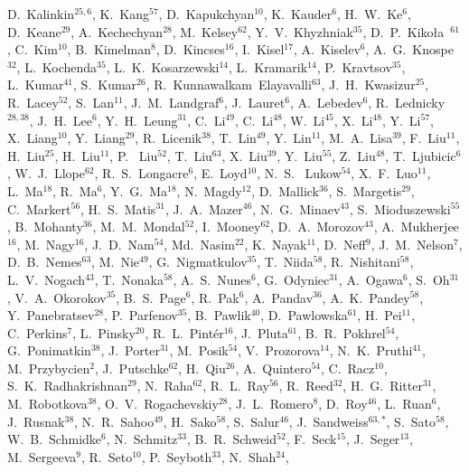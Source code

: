 {D.~Kalinkin$^{25,6}$,
K.~Kang$^{57}$,
D.~Kapukchyan$^{10}$,
K.~Kauder$^{6}$,
H.~W.~Ke$^{6}$,
D.~Keane$^{29}$,
A.~Kechechyan$^{28}$,
M.~Kelsey$^{62}$,
Y.~V.~Khyzhniak$^{35}$,
D.~P.~Kiko\l{}a~$^{61}$,
C.~Kim$^{10}$,
B.~Kimelman$^{8}$,
D.~Kincses$^{16}$,
I.~Kisel$^{17}$,
A.~Kiselev$^{6}$,
A.~G.~Knospe$^{32}$,
L.~Kochenda$^{35}$,
L.~K.~Kosarzewski$^{14}$,
L.~Kramarik$^{14}$,
P.~Kravtsov$^{35}$,
L.~Kumar$^{41}$,
S.~Kumar$^{26}$,
R.~Kunnawalkam~Elayavalli$^{63}$,
J.~H.~Kwasizur$^{25}$,
R.~Lacey$^{52}$,
S.~Lan$^{11}$,
J.~M.~Landgraf$^{6}$,
J.~Lauret$^{6}$,
A.~Lebedev$^{6}$,
R.~Lednicky$^{28,38}$,
J.~H.~Lee$^{6}$,
Y.~H.~Leung$^{31}$,
C.~Li$^{49}$,
C.~Li$^{48}$,
W.~Li$^{45}$,
X.~Li$^{48}$,
Y.~Li$^{57}$,
X.~Liang$^{10}$,
Y.~Liang$^{29}$,
R.~Licenik$^{38}$,
T.~Lin$^{49}$,
Y.~Lin$^{11}$,
M.~A.~Lisa$^{39}$,
F.~Liu$^{11}$,
H.~Liu$^{25}$,
H.~Liu$^{11}$,
P.~ Liu$^{52}$,
T.~Liu$^{63}$,
X.~Liu$^{39}$,
Y.~Liu$^{55}$,
Z.~Liu$^{48}$,
T.~Ljubicic$^{6}$,
W.~J.~Llope$^{62}$,
R.~S.~Longacre$^{6}$,
E.~Loyd$^{10}$,
N.~S.~ Lukow$^{54}$,
X.~F.~Luo$^{11}$,
L.~Ma$^{18}$,
R.~Ma$^{6}$,
Y.~G.~Ma$^{18}$,
N.~Magdy$^{12}$,
D.~Mallick$^{36}$,
S.~Margetis$^{29}$,
C.~Markert$^{56}$,
H.~S.~Matis$^{31}$,
J.~A.~Mazer$^{46}$,
N.~G.~Minaev$^{43}$,
S.~Mioduszewski$^{55}$,
B.~Mohanty$^{36}$,
M.~M.~Mondal$^{52}$,
I.~Mooney$^{62}$,
D.~A.~Morozov$^{43}$,
A.~Mukherjee$^{16}$,
M.~Nagy$^{16}$,
J.~D.~Nam$^{54}$,
Md.~Nasim$^{22}$,
K.~Nayak$^{11}$,
D.~Neff$^{9}$,
J.~M.~Nelson$^{7}$,
D.~B.~Nemes$^{63}$,
M.~Nie$^{49}$,
G.~Nigmatkulov$^{35}$,
T.~Niida$^{58}$,
R.~Nishitani$^{58}$,
L.~V.~Nogach$^{43}$,
T.~Nonaka$^{58}$,
A.~S.~Nunes$^{6}$,
G.~Odyniec$^{31}$,
A.~Ogawa$^{6}$,
S.~Oh$^{31}$,
V.~A.~Okorokov$^{35}$,
B.~S.~Page$^{6}$,
R.~Pak$^{6}$,
A.~Pandav$^{36}$,
A.~K.~Pandey$^{58}$,
Y.~Panebratsev$^{28}$,
P.~Parfenov$^{35}$,
B.~Pawlik$^{40}$,
D.~Pawlowska$^{61}$,
H.~Pei$^{11}$,
C.~Perkins$^{7}$,
L.~Pinsky$^{20}$,
R.~L.~Pint\'{e}r$^{16}$,
J.~Pluta$^{61}$,
B.~R.~Pokhrel$^{54}$,
G.~Ponimatkin$^{38}$,
J.~Porter$^{31}$,
M.~Posik$^{54}$,
V.~Prozorova$^{14}$,
N.~K.~Pruthi$^{41}$,
M.~Przybycien$^{2}$,
J.~Putschke$^{62}$,
H.~Qiu$^{26}$,
A.~Quintero$^{54}$,
C.~Racz$^{10}$,
S.~K.~Radhakrishnan$^{29}$,
N.~Raha$^{62}$,
R.~L.~Ray$^{56}$,
R.~Reed$^{32}$,
H.~G.~Ritter$^{31}$,
M.~Robotkova$^{38}$,
O.~V.~Rogachevskiy$^{28}$,
J.~L.~Romero$^{8}$,
D.~Roy$^{46}$,
L.~Ruan$^{6}$,
J.~Rusnak$^{38}$,
N.~R.~Sahoo$^{49}$,
H.~Sako$^{58}$,
S.~Salur$^{46}$,
J.~Sandweiss$^{63,*}$,
S.~Sato$^{58}$,
W.~B.~Schmidke$^{6}$,
N.~Schmitz$^{33}$,
B.~R.~Schweid$^{52}$,
F.~Seck$^{15}$,
J.~Seger$^{13}$,
M.~Sergeeva$^{9}$,
R.~Seto$^{10}$,
P.~Seyboth$^{33}$,
N.~Shah$^{24}$,
}
